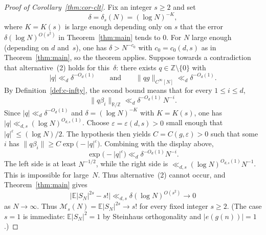 \begin{proof}[Proof of Corollary~\ref{thm:cor-clt}]
Fix an integer $s\geq 2$ and set
\begin{equation}\label{eq:delta-clt}
\delta=\delta_s(N)=(\log N)^{-K},
\end{equation}
where $K=K(s)$ is large enough depending only on $s$ that the error $\delta(\log N)^{O(s^2)}$ in Theorem~\ref{thm:main} tends to $0$.
For $N$ large enough (depending on $d$ and~$s$), one has $\delta>N^{-c_0}$ with $c_0=c_0(d,s)$ as in Theorem~\ref{thm:main}, so the theorem applies.  Suppose towards a contradiction that alternative~(2) holds for this~$\delta$: there exists $q\in\mathbb{Z}\setminus\{0\}$ with
\[
|q|\ll_d\delta^{-O_d(1)}\qquad\text{and}\qquad
\|qg\|_{C^\infty[N]}\ll_d\delta^{-O_d(1)}.
\]
By Definition~\ref{def:c-infty}, the second bound means that for every $1\leq i\leq d$,
\[
\|q\beta_i\|_{\mathbb{R}/\mathbb{Z}}\ll_d\delta^{-O_d(1)}\,N^{-i}.
\]
Since $|q|\ll_d\delta^{-O_d(1)}$ and $\delta=(\log N)^{-K}$ with $K=K(s)$, one has $|q|\ll_{d,s}(\log N)^{O_{d,s}(1)}$.
Choose $\varepsilon=\varepsilon(d,s)>0$ small enough that $|q|^{\varepsilon}\le(\log N)/2$.
The hypothesis then yields $C=C(g,\varepsilon)>0$ such that some $i$ has
$\|q\beta_i\|\geq C\exp\bigl(-|q|^{\varepsilon}\bigr)$.  Combining with the display above,
\[
\exp\bigl(-|q|^{\varepsilon}\bigr)\ll_d\delta^{-O_d(1)}N^{-i}.
\]
The left side is at least $N^{-1/2}$, while the right side is
$\ll_{d,s}(\log N)^{O_{d,s}(1)}N^{-1}$.
This is impossible for large~$N$.  Thus alternative~(2) cannot occur, and Theorem~\ref{thm:main} gives
\[
\bigl|\mathbb{E}|S_N|^{2s}-s!\bigr|
\ll_{d,s}\delta(\log N)^{O(s^2)}
\to 0
\]
as $N\to\infty$.  Thus $\mathcal{M}_s(N)=\mathbb{E}|S_N|^{2s}\to s!$ for every fixed integer $s\geq 2$.  (The case $s=1$ is immediate: $\mathbb{E}|S_N|^2=1$ by Steinhaus orthogonality and $|e(g(n))|=1$.)


\end{proof}
